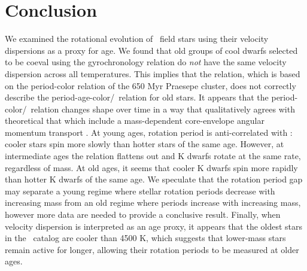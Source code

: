 \section{Conclusion}

We examined the rotational evolution of \kepler\ field stars using their
velocity dispersions as a proxy for age.
We found that old groups of cool dwarfs selected to be coeval using the
\citet{angus2019} gyrochronology relation do {\it not} have the same velocity
dispersion across all temperatures.
This implies that the \citet{angus2019} relation, which is based on the
period-color relation of the 650 Myr Praesepe cluster, does not correctly
describe the period-age-color/\teff\ relation for old stars.
It appears that the period-color/\teff\ relation changes shape over time in a
way that qualitatively agrees with theoretical that which include a
mass-dependent core-envelope angular momentum transport \citep{spada2019}.
At young ages, rotation period is anti-correlated with \teff: cooler stars
spin more slowly than hotter stars of the same age.
However, at intermediate ages the relation flattens out and K dwarfs rotate at
the same rate, regardless of mass.
At old ages, it seems that cooler K dwarfs spin more rapidly than hotter K
dwarfs of the same age.
We speculate that the rotation period gap \citep{mcquillan2014} may separate
a young regime where stellar rotation periods decrease with increasing mass
from an old regime where periods increase with increasing mass, however more
data are needed to provide a conclusive result.
Finally, when velocity dispersion is interpreted as an age proxy, it appears
that the oldest stars in the \mct\ catalog are cooler than 4500 K, which
suggests that lower-mass stars remain active for longer, allowing their
rotation periods to be measured at older ages.

